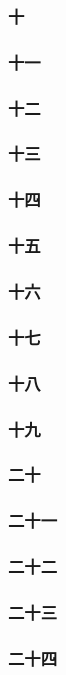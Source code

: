 \subsubsection*{十}
\subsubsection*{十一}
\subsubsection*{十二}
\subsubsection*{十三}
\subsubsection*{十四}
\subsubsection*{十五}
\subsubsection*{十六}
\subsubsection*{十七}
\subsubsection*{十八}
\subsubsection*{十九}
\subsubsection*{二十}
\subsubsection*{二十一}
\subsubsection*{二十二}
\subsubsection*{二十三}
\subsubsection*{二十四}
